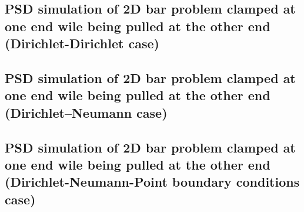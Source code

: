 \subsection{PSD simulation of 2D bar problem clamped at one end wile being pulled at the other end (Dirichlet-Dirichlet case)\label{sec:2d-bar-clamped2}}

{
	\renewcommand{\subsection}{\subsubsection}
	
}


\pagebreak


\subsection{PSD simulation of 2D bar problem clamped at one end wile being pulled at the other end (Dirichlet--Neumann case)\label{sec:2d-bar-clamped3}}

{
	\renewcommand{\subsection}{\subsubsection}
	
}
 

\pagebreak




\subsection{PSD simulation of 2D bar problem clamped at one end wile being pulled at the other end (Dirichlet-Neumann-Point boundary conditions case)\label{sec:2d-bar-clamped4}}


{
	\renewcommand{\subsection}{\subsubsection}
	
}



